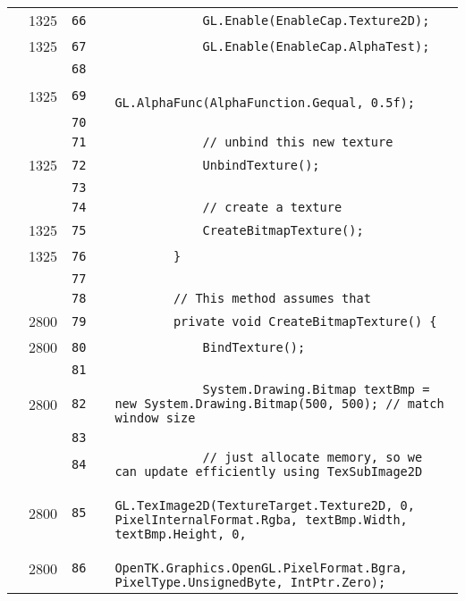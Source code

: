 \documentclass[a4paper,landscape,10pt]{article}
\begin{document}
\begin{longtable}[l]{lrrll}
\cellcolor{green} & 1325 & \verb~66~ & & \verb~            GL.Enable(EnableCap.Texture2D);~\\
\cellcolor{green} & 1325 & \verb~67~ & & \verb~            GL.Enable(EnableCap.AlphaTest);~\\
\cellcolor{gray} &  & \verb~68~ & & \verb~~\\
\cellcolor{green} & 1325 & \verb~69~ & & \verb~            GL.AlphaFunc(AlphaFunction.Gequal, 0.5f);~\\
\cellcolor{gray} &  & \verb~70~ & & \verb~~\\
\cellcolor{gray} &  & \verb~71~ & & \verb~            // unbind this new texture~\\
\cellcolor{green} & 1325 & \verb~72~ & & \verb~            UnbindTexture();~\\
\cellcolor{gray} &  & \verb~73~ & & \verb~~\\
\cellcolor{gray} &  & \verb~74~ & & \verb~            // create a texture~\\
\cellcolor{green} & 1325 & \verb~75~ & & \verb~            CreateBitmapTexture();~\\
\cellcolor{green} & 1325 & \verb~76~ & & \verb~        }~\\
\cellcolor{gray} &  & \verb~77~ & & \verb~~\\
\cellcolor{gray} &  & \verb~78~ & & \verb~        // This method assumes that~\\
\cellcolor{green} & 2800 & \verb~79~ & & \verb~        private void CreateBitmapTexture() {~\\
\cellcolor{green} & 2800 & \verb~80~ & & \verb~            BindTexture();~\\
\cellcolor{gray} &  & \verb~81~ & & \verb~~\\
\cellcolor{green} & 2800 & \verb~82~ & & \verb~            System.Drawing.Bitmap textBmp = new System.Drawing.Bitmap(500, 500); // match window size~\\
\cellcolor{gray} &  & \verb~83~ & & \verb~~\\
\cellcolor{gray} &  & \verb~84~ & & \verb~            // just allocate memory, so we can update efficiently using TexSubImage2D~\\
\cellcolor{green} & 2800 & \verb~85~ & & \verb~            GL.TexImage2D(TextureTarget.Texture2D, 0, PixelInternalFormat.Rgba, textBmp.Width, textBmp.Height, 0,~\\
\cellcolor{green} & 2800 & \verb~86~ & & \verb~                OpenTK.Graphics.OpenGL.PixelFormat.Bgra, PixelType.UnsignedByte, IntPtr.Zero);~\\

\end{longtable}
\end{document}
